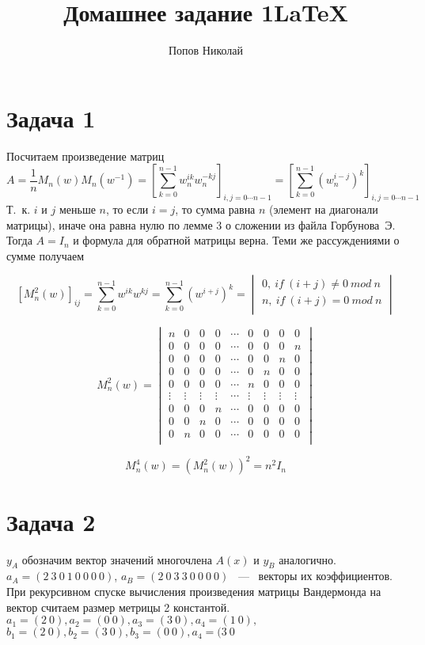 \documentclass[a4paper,12pt]{article} %
\author{Попов Николай}
\title{Домашнее задание 1\LaTeX{}}
\begin{document}
\section*{Задача 1}
Посчитаем произведение матриц 
\[
A = \dfrac{1}{n}M_n(w)M_n(w^{-1})=\left[\sum_{k=0}^{n-1}{w_n^{ik}w_n^{-kj}}\right]_{i,j=0\cdots n-1} =
\left[\sum_{k=0}^{n-1}{\left(w_n^{i-j}\right)^{k}}\right]_{i,j=0\cdots n-1} 
\]
Т.~к. $i$ и $j$ меньше $n$, то если $i = j$, то сумма равна $n$ (элемент на диагонали матрицы), иначе  
она равна нулю по лемме 3 о сложении из файла Горбунова~Э. Тогда $A = I_n$ и формула для обратной матрицы верна. Теми же рассуждениями о сумме получаем

\[
[M_n^2(w)]_{ij}=\sum_{k=0}^{n-1}{w^{ik}w^{kj}}=\sum_{k=0}^{n-1}{\left(w^{i+j}\right)^k} = \begin{vmatrix}
0,~if~(i+j)\neq 0~mod~n\\
n,~if~(i+j)=0~mod~n\\
\end{vmatrix} 
\]

\[
M_n^2(w)=
\begin{vmatrix}
n&0&0&0&  \cdots&0&0&0&0\\
0&0&0&0& \cdots&0&0&0&n\\
0&0&0&0& \cdots&0&0&n&0\\
0&0&0&0& \cdots&0&n&0&0\\
0&0&0&0& \cdots&n&0&0&0\\
\vdots&\vdots&\vdots&\vdots& \cdots&\vdots&\vdots&\vdots&\vdots\\
0&0&0&n& \cdots&0&0&0&0\\
0&0&n&0& \cdots&0&0&0&0\\
0&n&0&0& \cdots&0&0&0&0\\
\end{vmatrix}
\]

\[
M_n^4(w)=\left(M_n^2(w)\right)^2=n^2I_n
\]



\section*{Задача 2}
${y}_A$ обозначим вектор значений многочлена $A(x)$ и ${y}_B$ аналогично. \\
$a_A = (2~3~0~1~0~0~0~0)$, $a_B = (2~0~3~3~0~0~0~0)$  ~---~ векторы их коэффициентов. При рекурсивном спуске вычисления произведения матрицы Вандермонда на вектор считаем размер метрицы 2 константой.\\
$a_1=(2~0), a_2=(0~0), a_3= (3~0), a_4 =(1~0),$ \\
$ b_1=(2~0), b_2=(3~0), b_3= (0~0), a_4 =(3~0$\\
\end{document}
